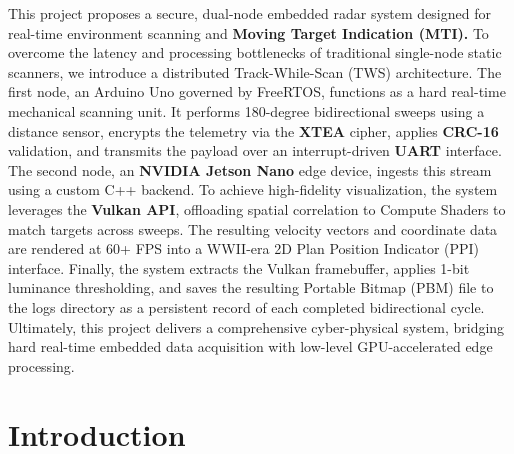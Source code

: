 \documentclass[14pt]{article}
\begin{document}
This project proposes a secure, dual-node embedded radar system designed for real-time environment scanning and \textbf{Moving Target Indication (MTI).} To overcome the latency and processing bottlenecks of traditional single-node static scanners, we introduce a distributed Track-While-Scan (TWS) architecture. The first node, an Arduino Uno governed by FreeRTOS, functions as a hard real-time mechanical scanning unit. It performs 180-degree bidirectional sweeps using a distance sensor, encrypts the telemetry via the \textbf{XTEA} cipher, applies \textbf{CRC-16} validation, and transmits the payload over an interrupt-driven \textbf{UART} interface. The second node, an \textbf{NVIDIA Jetson Nano} edge device, ingests this stream using a custom C++ backend. To achieve high-fidelity visualization, the system leverages the \textbf{Vulkan API}, offloading spatial correlation to Compute Shaders to match targets across sweeps. The resulting velocity vectors and coordinate data are rendered at 60+ FPS into a WWII-era 2D Plan Position Indicator (PPI) interface. Finally, the system extracts the Vulkan framebuffer, applies 1-bit luminance thresholding, and saves the resulting Portable Bitmap (PBM) file to the logs directory as a persistent record of each completed bidirectional cycle. Ultimately, this project delivers a comprehensive cyber-physical system, bridging hard real-time embedded data acquisition with low-level GPU-accelerated edge processing.


\cleardoublepage

\section{Introduction}
\end{document}
